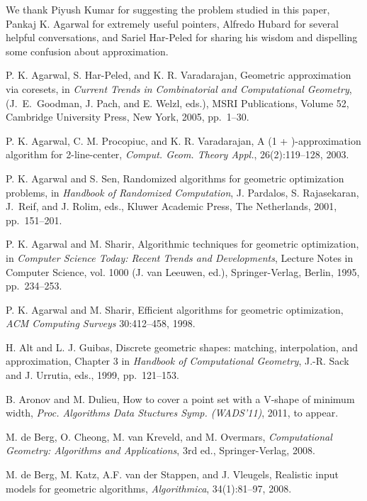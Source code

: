 \documentclass{llncs}
\begin{document}
We thank Piyush Kumar for suggesting the problem studied in this
paper, Pankaj K. Agarwal for extremely useful pointers, Alfredo Hubard
for several helpful conversations, and Sariel Har-Peled for sharing
his wisdom and dispelling some confusion about approximation.



\begin{thebibliography}{99}
P. K. Agarwal, S. Har-Peled, and K. R. Varadarajan,
Geometric approximation via coresets,
in
\emph{Current Trends in Combinatorial and Computational Geometry},
(J.~E.~Goodman, J. Pach, and E. Welzl, eds.), MSRI Publications,
Volume 52, Cambridge University Press, New York, 2005, pp.~1--30.

P. K. Agarwal, C. M. Procopiuc, and K. R. Varadarajan,
A (1 + )-approximation algorithm for 2-line-center,
\emph{Comput. Geom. Theory Appl.}, 26(2):119--128, 2003. 
 
P. K. Agarwal and S. Sen,
Randomized algorithms for geometric optimization problems,
in
\emph{Handbook of Randomized Computation}, J. Pardalos,
S. Rajasekaran, J.~Reif, and J. Rolim, eds., Kluwer Academic Press,
The Netherlands, 2001, pp.~151--201.

P. K. Agarwal and M. Sharir,
Algorithmic techniques for geometric optimization,
in \emph{Computer Science Today: Recent Trends and Developments},
Lecture Notes in Computer Science, vol. 1000 (J. van Leeuwen, ed.),
Springer-Verlag, Berlin, 1995, pp.~234--253. 
	 
P. K. Agarwal and M. Sharir,
Efficient algorithms for geometric optimization,
\emph{ACM Computing Surveys} 30:412--458, 1998.
	
H. Alt and L. J. Guibas, 
Discrete geometric shapes: matching, interpolation, and approximation,
Chapter 3 in \emph{Handbook of Computational Geometry}, J.-R. Sack and
J. Urrutia, eds., 1999, pp.~121--153.

 B. Aronov and M. Dulieu, 
How to cover a point set with a V-shape of minimum width,
\emph{Proc. Algorithms Data Stuctures Symp. (WADS'11)}, 2011, to appear.

 M. de Berg, O. Cheong, M. van Kreveld, and M. Overmars, 
 \emph{Computational Geometry: Algorithms and Applications},
 3rd ed., Springer-Verlag, 2008.

M. de Berg, M. Katz, A.F. van der Stappen, and J. Vleugels, 
Realistic input models for geometric algorithms,
\emph{Algorithmica},
34(1):81--97, 2008.


\end{thebibliography}
\end{document}
